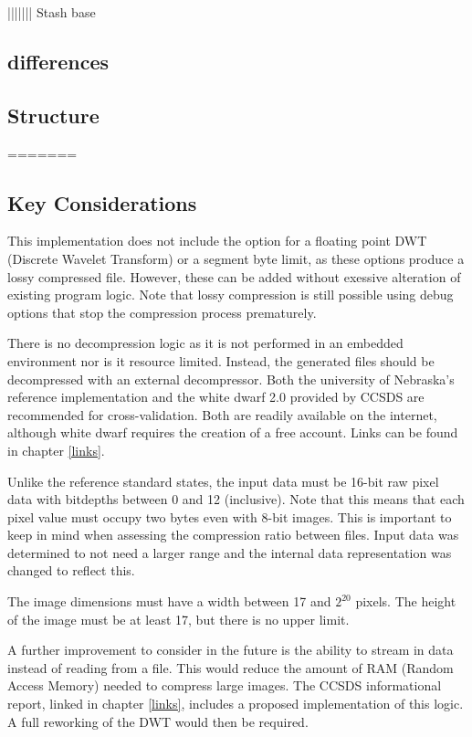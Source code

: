 \documentclass[12pt, a4paper]{article}
\begin{document}
\newpage
||||||| Stash base
\subsection{differences}
\subsection{Structure}
=======
\subsection{Key Considerations}
This implementation does not include the option for a floating point 
DWT (Discrete Wavelet Transform) or a segment byte limit, 
as these options produce a lossy compressed file.
However, these can be added without exessive alteration of existing program logic.
Note that lossy compression is still possible using debug options that 
stop the compression process prematurely. 

\medskip
\noindent
There is no decompression logic as it is not performed in an embedded environment nor is it resource limited. 
Instead, the generated files should be decompressed with an external decompressor.
Both the university of Nebraska's reference implementation and the white dwarf 2.0 provided by CCSDS are 
recommended for cross-validation. Both are readily available on the internet, 
although white dwarf requires the creation of a free account. 
Links can be found in chapter \ref{links}.

\medskip
\noindent
Unlike the reference standard states, the input data must be 16-bit raw pixel data with bitdepths between 0 and 12 (inclusive). 
Note that this means that each pixel value must occupy two bytes even with 8-bit images. 
This is important to keep in mind when assessing the compression ratio between files. 
Input data was determined to not need a larger range and the internal data representation was changed to reflect this.

\medskip
\noindent
The image dimensions must have a width between 17 and \(2^{20}\) pixels. 
The height of the image must be at least 17, but there is no upper limit.

\medskip
\noindent
A further improvement to consider in the future is the ability to stream in data instead of reading from a file. 
This would reduce the amount of RAM (Random Access Memory) needed to compress large images. 
The CCSDS informational report, linked in chapter \ref{links}, includes a proposed implementation of this logic. 
A full reworking of the DWT would then be required.
\end{document}
